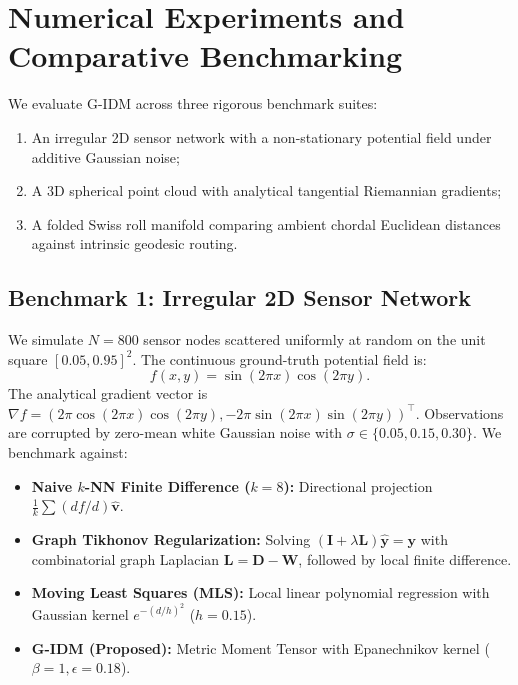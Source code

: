 \documentclass[11pt,a4paper]{article}
\theoremstyle{definition}
\begin{document}
\section{Numerical Experiments and Comparative Benchmarking}
\label{sec:experiments}

We evaluate G-IDM across three rigorous benchmark suites:
\begin{enumerate}
    \item An irregular 2D sensor network with a non-stationary potential field under additive Gaussian noise;
    \item A 3D spherical point cloud with analytical tangential Riemannian gradients;
    \item A folded Swiss roll manifold comparing ambient chordal Euclidean distances against intrinsic geodesic routing.
\end{enumerate}

\subsection{Benchmark 1: Irregular 2D Sensor Network}
We simulate $N = 800$ sensor nodes scattered uniformly at random on the unit square $[0.05, 0.95]^2$. The continuous ground-truth potential field is:
\begin{equation}
f(x, y) = \sin(2\pi x) \cos(2\pi y).
\end{equation}
The analytical gradient vector is $\nabla f = (2\pi \cos(2\pi x)\cos(2\pi y), -2\pi \sin(2\pi x)\sin(2\pi y))^\top$.
Observations are corrupted by zero-mean white Gaussian noise with $\sigma \in \{0.05, 0.15, 0.30\}$. 
We benchmark against:
\begin{itemize}
    \item \textbf{Naive $k$-NN Finite Difference ($k = 8$):} Directional projection $\frac{1}{k}\sum (df/d)\hat{\mathbf{v}}$.
    \item \textbf{Graph Tikhonov Regularization:} Solving $(\mathbf{I} + \lambda \mathbf{L})\hat{\mathbf{y}} = \mathbf{y}$ with combinatorial graph Laplacian $\mathbf{L} = \mathbf{D} - \mathbf{W}$, followed by local finite difference.
    \item \textbf{Moving Least Squares (MLS):} Local linear polynomial regression with Gaussian kernel $e^{-(d/h)^2}$ ($h = 0.15$).
    \item \textbf{G-IDM (Proposed):} Metric Moment Tensor with Epanechnikov kernel ($\beta = 1, \epsilon = 0.18$).
\end{itemize}
\end{document}

